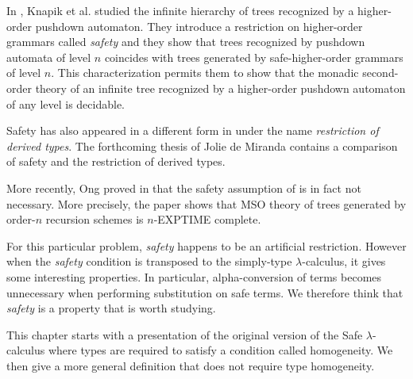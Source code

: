 
In \cite{KNU02}, Knapik et al. studied the infinite hierarchy of
trees recognized by a higher-order pushdown automaton. They
introduce a restriction on higher-order grammars called
\emph{safety} and they show that trees recognized by pushdown
automata of level $n$ coincides with trees generated by
safe-higher-order grammars of level $n$. This characterization
permits them to show that the monadic second-order theory of an
infinite tree recognized by a higher-order pushdown automaton of any
level is decidable.

Safety has also appeared in a different form in \cite{Dam82} under
the name \emph{restriction of derived types}. The forthcoming thesis
of Jolie de Miranda \citep{demirandathesis} contains a comparison of
safety and the restriction of derived types.

More recently, Ong proved in \cite{OngLics2006} that the safety
assumption of \cite{KNU02} is in fact not necessary. More precisely,
the paper shows that MSO theory of trees generated by order-$n$
recursion schemes is $n$-EXPTIME complete.

For this particular problem, \emph{safety} happens to be an
artificial restriction. However when the \emph{safety} condition is
transposed to the simply-type $\lambda$-calculus, it gives some
interesting properties. In particular, alpha-conversion of terms
becomes unnecessary when performing substitution on safe terms. We
therefore think that \emph{safety} is a property that is worth
studying.

This chapter starts with a presentation of the original version of
the Safe $\lambda$-calculus where types are required to satisfy a
condition called homogeneity. We then give a more general definition
that does not require type homogeneity.

